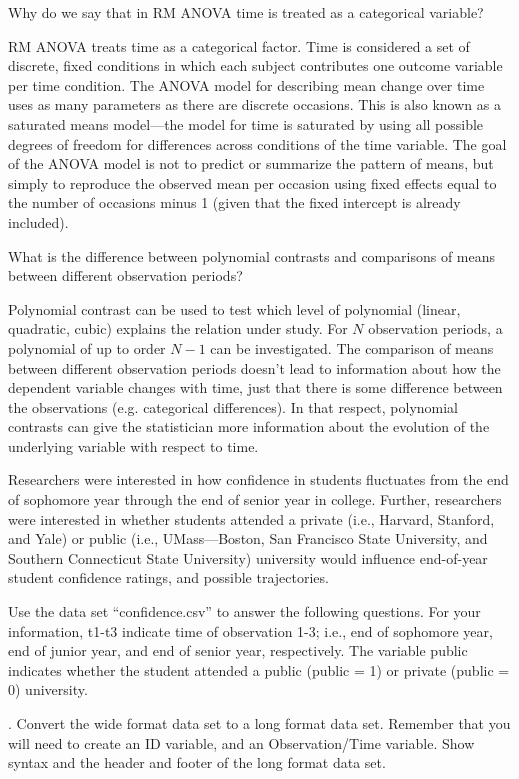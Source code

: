 \documentclass[onecolumn,10pt]{jhwhw}
\begin{document}
\problem{}
Why do we say that in RM ANOVA time is treated as a categorical variable?

RM ANOVA treats time as a categorical factor. Time is considered a set of discrete, fixed conditions in which each subject contributes one outcome variable per time condition. The ANOVA model for describing mean change over time uses as many parameters as there are discrete occasions. This is also known as a saturated means model---the model for time is saturated by using all possible degrees of freedom for differences across conditions of the time variable. The goal of the ANOVA model is not to predict or summarize the pattern of means, but simply to reproduce the observed mean per occasion using fixed effects equal to the number of occasions minus 1 (given that the fixed intercept is already included).

\problem{}
What is the difference between polynomial contrasts and comparisons of means between different observation periods?

Polynomial contrast can be used to test which level of polynomial (linear, quadratic, cubic) explains the relation under study. For $N$ observation periods, a polynomial of up to order $N-1$ can be investigated. The comparison of means between different observation periods doesn't lead to information about how the dependent variable changes with time, just that there is some difference between the observations (e.g. categorical differences). In that respect, polynomial contrasts can give the statistician more information about the evolution of the underlying variable with respect to time.

\problem{}
Researchers were interested in how confidence in students fluctuates from the end of sophomore year through the end of senior year in college. Further, researchers were interested in whether students attended a private (i.e., Harvard, Stanford, and Yale) or public (i.e., UMass---Boston, San Francisco State University, and Southern Connecticut State University) university would influence end-of-year student confidence ratings, and possible trajectories.

Use the data set “confidence.csv” to answer the following questions. For your information, t1-t3 indicate time of observation 1-3; i.e., end of sophomore year, end of junior year, and end of senior year, respectively. The variable public indicates whether the student attended a public (public = 1) or private (public = 0) university.

. Convert the wide format data set to a long format data set. Remember that you will need to create an ID variable, and an Observation/Time variable. Show syntax and the header and footer of the long format data set.\\
\end{document}
